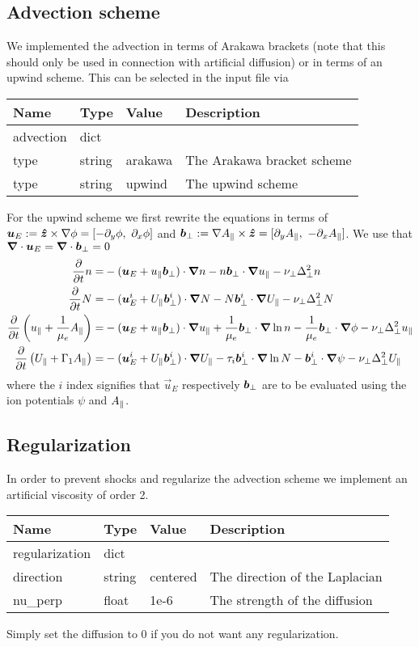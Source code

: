 \subsection{Advection scheme}
We implemented the advection in terms of Arakawa brackets
(note that this should only be used in connection with artificial diffusion)
or in terms of an upwind scheme.
This can be selected in the input file via
\begin{longtable}{llll}
\toprule
\rowcolor{gray!50}\textbf{Name} &  \textbf{Type} & \textbf{Value}  & \textbf{Description}  \\ \midrule
advection & dict & & \\
\qquad type & string & arakawa & The Arakawa bracket scheme \\
\qquad type & string & upwind  & The upwind scheme \\
\bottomrule
\end{longtable}
For the upwind scheme we first rewrite the equations in terms of
${\boldsymbol{u}}_E := \bm{\hat{z}} \times \nabla\phi = [-\partial_y \phi,\ \partial_x \phi]$ and
$ {\boldsymbol{b}}_\perp := \nabla A_\parallel \times \bm{\hat{z}} = [\partial_y A_\parallel,\ -\partial_x A_\parallel]$. We use
that ${\boldsymbol{\nabla}}\cdot {\boldsymbol{u}}_E = {\boldsymbol{\nabla}}\cdot  {\boldsymbol{b}}_\perp =0$
\begin{align}
\frac{\partial}{\partial t} n  =&
- ( {\boldsymbol{u}}_E + u_\parallel  {\boldsymbol{b}}_\perp)\cdot{\boldsymbol{\nabla}} n  - n   {\boldsymbol{b}}_\perp \cdot{\boldsymbol{\nabla}}  u_\parallel
-\nu_\perp \Delta_\perp^2n 
\\
\frac{\partial}{\partial t} N =&
- ( {\boldsymbol{u}}_E^i + U_\parallel  {\boldsymbol{b}}_\perp^i)\cdot{\boldsymbol{\nabla}} N - N  {\boldsymbol{b}}_\perp^i\cdot{\boldsymbol{\nabla}}  U_\parallel
-\nu_\perp \Delta_\perp^2N
 \\
\frac{\partial}{\partial t} \left( u_\parallel+ \frac{1}{\mu_e} A_\parallel \right) =&
-  ({\boldsymbol{u}}_E + u_\parallel  {\boldsymbol{b}}_\perp ) \cdot{\boldsymbol{\nabla}} u_\parallel
+ \frac{1}{\mu_e}  {\boldsymbol{b}}_\perp \cdot{\boldsymbol{\nabla}} \ln n 
- \frac{1}{\mu_e}  {\boldsymbol{b}}_\perp \cdot{\boldsymbol{\nabla}} \phi
    -\nu_\perp \Delta_\perp^2u_\parallel
      \\
      \frac{\partial}{\partial t} \left( U_\parallel+ \Gamma_1 A_\parallel  \right) =&
    - ({\boldsymbol{u}}_E^i + U_\parallel  {\boldsymbol{b}}_\perp^i ) \cdot{\boldsymbol{\nabla}} U_\parallel
    - \tau_i  {\boldsymbol{b}}_\perp^i \cdot{\boldsymbol{\nabla}} \ln N
    -  {\boldsymbol{b}}_\perp^i \cdot{\boldsymbol{\nabla}} \psi
    - \nu_\perp \Delta_\perp^2U_\parallel
\end{align}
where the $i$ index signifies that $\vec u_E$ respectively $ {\boldsymbol{b}}_\perp$ are to
be evaluated using the ion potentials $\psi$ and $A_\parallel$.
\subsection{Regularization}
In order to prevent shocks and regularize the advection scheme
we implement an artificial viscosity of order 2.
\begin{longtable}{llll}
\toprule
\rowcolor{gray!50}\textbf{Name} &  \textbf{Type} & \textbf{Value}  & \textbf{Description}  \\ \midrule
regularization & dict & & \\
\qquad direction & string & centered & The direction of the Laplacian \\
\qquad nu\_perp & float & 1e-6  &  The strength of the diffusion \\
\bottomrule
\end{longtable}
Simply set the diffusion to 0 if you do not want any regularization.


